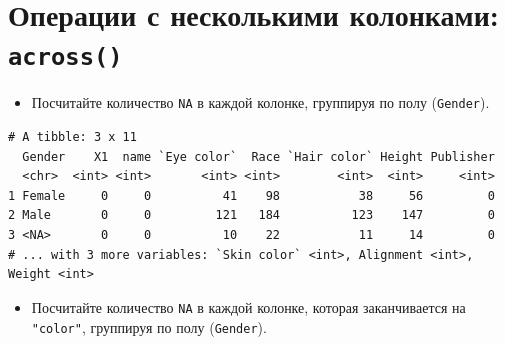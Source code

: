 \documentclass[
]{book}
\newenvironment{Shaded}{\begin{snugshade}}{\end{snugshade}}
\newcommand{\ControlFlowTok}[1]{\textcolor[rgb]{0.13,0.29,0.53}{\textbf{#1}}}
\newcommand{\KeywordTok}[1]{\textcolor[rgb]{0.13,0.29,0.53}{\textbf{#1}}}
\newcommand{\NormalTok}[1]{#1}
\newcommand{\OperatorTok}[1]{\textcolor[rgb]{0.81,0.36,0.00}{\textbf{#1}}}
\newcommand{\StringTok}[1]{\textcolor[rgb]{0.31,0.60,0.02}{#1}}
\providecommand{\tightlist}{%
  \setlength{\itemsep}{0pt}\setlength{\parskip}{0pt}}
\begin{document}
\hypertarget{solution_across}{%
\section{\texorpdfstring{Операции с несколькими колонками: \texttt{across()}}{Операции с несколькими колонками: across()}}\label{solution_across}}

\begin{itemize}
\tightlist
\item
  Посчитайте количество \texttt{NA} в каждой колонке, группируя по полу (\texttt{Gender}).
\end{itemize}

\begin{Shaded}
\end{Shaded}

\begin{verbatim}
# A tibble: 3 x 11
  Gender    X1  name `Eye color`  Race `Hair color` Height Publisher
  <chr>  <int> <int>       <int> <int>        <int>  <int>     <int>
1 Female     0     0          41    98           38     56         0
2 Male       0     0         121   184          123    147         0
3 <NA>       0     0          10    22           11     14         0
# ... with 3 more variables: `Skin color` <int>, Alignment <int>, Weight <int>
\end{verbatim}

\begin{itemize}
\tightlist
\item
  Посчитайте количество \texttt{NA} в каждой колонке, которая заканчивается на \texttt{"color"}, группируя по полу (\texttt{Gender}).
\end{itemize}

\begin{Shaded}
\end{Shaded}
\end{document}
